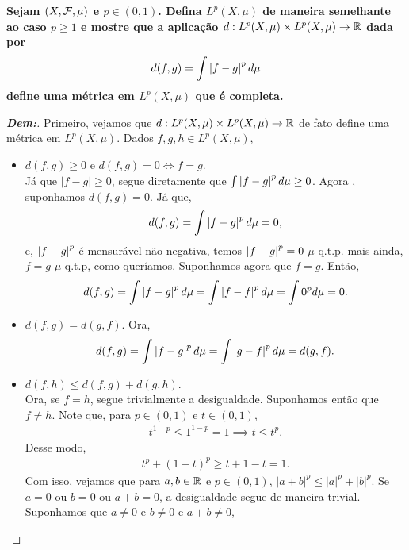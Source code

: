 \textbf{Sejam $(X, \mathcal F, \mu)$ e $ p \in (0, 1)$. Defina $L^p(X, \mu)$
de maneira semelhante ao caso $p \ge 1$ 
e mostre que a aplicação $d: L^p(X,\mu) \times L^p(X, \mu) \rightarrow \mathbb R$
dada por 
\begin{align*}
  d(f, g) = \int \left|f - g\right|^p d\mu
\end{align*}
define uma métrica em $L^p(X, \mu)$ que é completa.}
\begin{proof}[\textbf{Dem:}] Primeiro, vejamos que 
  $d: L^p(X, \mu)\times L^p(X, \mu) \rightarrow \mathbb R$ de fato 
  define uma métrica em $L^p(X, \mu)$. Dados 
  $f, g, h \in L^p(X, \mu)$,
\begin{itemize}
  \item $d(f, g) \ge 0$ e $d(f, g) = 0 \iff f = g.$\\
    Já que $|f-g|\ge 0$, segue diretamente que $\int \left|f - g\right|^p d\mu \ge 0$. 
    Agora , suponhamos $d(f, g) = 0$. Já que, 
    \begin{align*}
      d(f, g) = \int \left|f - g\right|^p d\mu = 0,
    \end{align*}
    e, $\left|f - g\right|^p$ é mensurável não-negativa, temos $\left|f-g\right|^p = 0$ 
    $\mu$-q.t.p. mais ainda, $f = g$ $\mu$-q.t.p, como queríamos. Suponhamos 
    agora que $f = g$. Então, 
    \begin{align*}
      d(f, g) = \int \left|f - g\right|^p d\mu = \int \left|f - f\right|^p d\mu = \int 0^p d\mu = 0.
    \end{align*}
  \item $d(f, g) = d(g, f)$. 
    Ora, 
    \begin{align*}
      d(f,g ) = \int \left|f - g\right|^p d\mu = \int \left|g - f\right|^p d\mu = d(g , f).
    \end{align*}
  \item $d(f, h) \le d(f, g) + d(g, h)$.\\
    Ora, se $f = h$, segue trivialmente a desigualdade. Suponhamos então 
    que $f \neq h$.
    Note que, para $p \in (0, 1)$ e $t \in (0, 1)$,
    \begin{align*}
      t^{1-p} \le 1^{1-p} = 1 \implies t \le t^p.
    \end{align*}
    Desse modo, 
    \begin{align*}
      t^p + (1-t)^p \ge t + 1 - t = 1.
    \end{align*}
    Com isso, vejamos que para $a, b \in \mathbb R$ e $p \in (0, 1)$, 
    $|a + b|^p \le |a|^p + |b|^p$. Se $a = 0$ ou $b = 0$ ou $a + b = 0$, a desigualdade 
    segue de maneira trivial. Suponhamos que $a \neq 0$ e $b \neq 0$ e $a + b \neq 0$, 

\end{itemize}
\end{proof}
